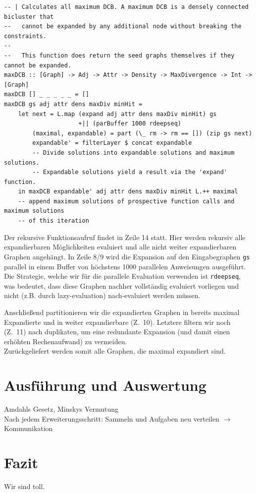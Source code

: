 \documentclass[a4paper]{scrartcl}
\begin{document}
\begin{lstlisting}[caption={Die maxDCB-Funktion},label=lst:maxDCB]
-- | Calculates all maximum DCB. A maximum DCB is a densely connected bicluster that
--   cannot be expanded by any additional node without breaking the constraints.
--   
--   This function does return the seed graphs themselves if they cannot be expanded.
maxDCB :: [Graph] -> Adj -> Attr -> Density -> MaxDivergence -> Int -> [Graph]
maxDCB [] _ _ _ _ _ = []
maxDCB gs adj attr dens maxDiv minHit =
    let next = L.map (expand adj attr dens maxDiv minHit) gs
                     +|| (parBuffer 1000 rdeepseq)
        (maximal, expandable) = part (\_ rm -> rm == []) (zip gs next)
        expandable' = filterLayer $ concat expandable
        -- Divide solutions into expandable solutions and maximum solutions.
        -- Expandable solutions yield a result via the 'expand' function.
    in maxDCB expandable' adj attr dens maxDiv minHit L.++ maximal
    -- append maximum solutions of prospective function calls and maximum solutions
    -- of this iteration
\end{lstlisting}

Der rekursive Funktionsaufruf findet in Zeile 14 statt. Hier werden rekursiv alle expandierbaren Möglichkeiten evaluiert und alle nicht weiter expandierbaren Graphen angehängt. In Zeile 8/9 wird die Expansion auf den Eingabegraphen \texttt{gs} parallel in einem Buffer von höchstens 1000 parallelen Anweisungen ausgeführt. Die Strategie, welche wir für die parallele Evaluation verwenden ist \texttt{rdeepseq}, was bedeutet, dass diese Graphen nachher vollständig evaluiert vorliegen und nicht (z.B. durch lazy-evaluation) nach-evaluiert werden müssen.\par
\medskip
Anschließend partitionieren wir die expandierten Graphen in bereits maximal Expandierte und in weiter expandierbare (Z.~10). Letztere filtern wir noch (Z.~11) nach duplikaten, um eine redundante Expansion (und damit einen erhöhten Rechenaufwand) zu vermeiden.\\
Zurückgeliefert werden somit alle Graphen, die maximal expandiert sind.


\section{Ausführung und Auswertung}
Amdahls Gesetz, Minskys Vermutung\\
Nach jedem Erweiterungsschritt: Sammeln und Aufgaben neu verteilen $\rightarrow$ Kommunikation

\section{Fazit}
Wir sind toll.

\newpage
\printbibliography[heading=bibintoc]
\end{document}
